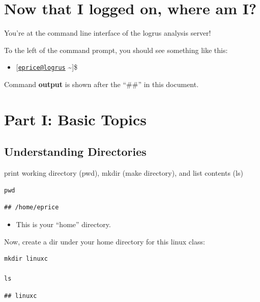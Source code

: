 \documentclass[
]{book}
\providecommand{\tightlist}{%
  \setlength{\itemsep}{0pt}\setlength{\parskip}{0pt}}
\begin{document}
\hypertarget{now-that-i-logged-on-where-am-i}{%
\section{Now that I logged on, where am I?}\label{now-that-i-logged-on-where-am-i}}

You're at the command line interface of the logrus analysis server!

To the left of the command prompt, you should see something like this:

\begin{itemize}
\tightlist
\item
  {[}\href{mailto:eprice@logrus}{\nolinkurl{eprice@logrus}} \textasciitilde{]}\$
\end{itemize}

Command \textbf{output} is shown after the ``\#\#'' in this document.

\hypertarget{part-i-basic-topics}{%
\section{Part I: Basic Topics}\label{part-i-basic-topics}}

\hypertarget{understanding-directories}{%
\subsection{Understanding Directories}\label{understanding-directories}}

print working directory (pwd), mkdir (make directory), and list contents (ls)

\begin{verbatim}
pwd
\end{verbatim}

\begin{verbatim}
## /home/eprice
\end{verbatim}

\begin{itemize}
\tightlist
\item
  This is your ``home'' directory.
\end{itemize}

Now, create a dir under your home directory for this linux class:

\begin{verbatim}
mkdir linuxc

ls
\end{verbatim}

\begin{verbatim}
## linuxc
\end{verbatim}
\end{document}
